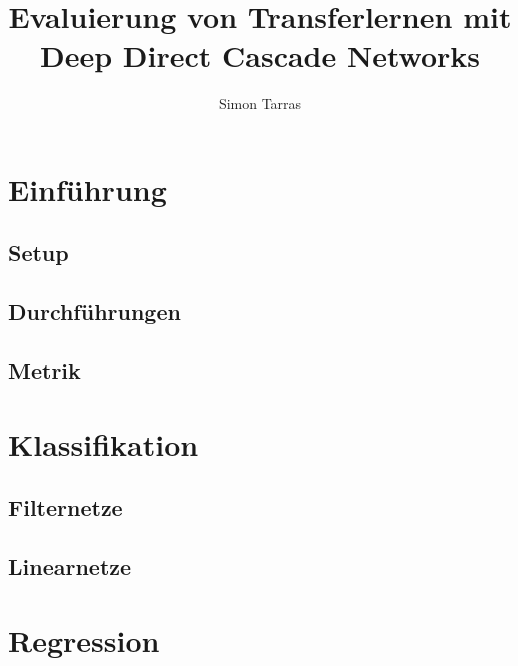 \documentclass[ngerman]{report}
\title{Evaluierung von Transferlernen mit Deep Direct Cascade Networks}
\author{Simon Tarras}
\begin{document}
    \maketitle
    \tableofcontents
    \chapter{Einführung}
    \section{Setup}
    
    \section{Durchführungen}
    
    \section{Metrik}
    
    \chapter{Klassifikation}
    \section{Filternetze}
    
    \section{Linearnetze}
    
    \chapter{Regression}
\end{document}
